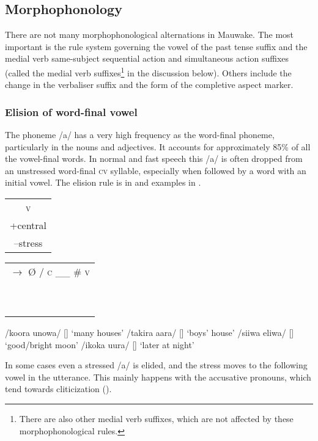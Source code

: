 \subsection{Morphophonology}\label{sec:2.3.3}

There are not many morphophonological alternations in Mauwake.  The most important is the rule system governing the vowel of the past tense suffix and the medial verb same-subject sequential action and simultaneous action suffixes (called the medial verb suffixes\footnote{There are also other medial verb suffixes, which are not  affected by these morphophonological rules.} in the discussion below).  Others include the change in the verbaliser suffix and the form of the completive aspect marker.

\subsubsection{Elision of word-final vowel}

The phoneme /a/ has a very high frequency as the word-final phoneme, particularly in the nouns and adjectives.  It accounts for approximately 85\% of all the vowel-final words.  In normal and fast speech this /a/ is often dropped from an unstressed word-final \textsc{cv} syllable, especially when followed by a word with an initial vowel. The elision rule is in   and examples in . 

\ea
\label{ex:2:elisionrule}
\begin{tabular}{c}\textsc{v}\\+central\\--stress\\    \end{tabular}
\begin{tabular}{c}    $\rightarrow $ {\O}  /  \textsc{c} \_\_  \#  \textsc{v} \\~\\~\\    \end{tabular}
\z

\ea
\label{ex:2:elisionexample}
\ea
/koora unowa/  []  `many houses'
\ex
/takira {\textphi}aara/  []  `boys' house'
\ex
/siiwa eliwa/  []  `good/bright moon'
\ex
/ikoka uura/  []  `later at night'
\z
\z

In some cases even a stressed /a/ is elided, and the stress moves to the following vowel in the utterance.  This mainly happens with the accusative pronouns, which tend towards cliticization  ().

